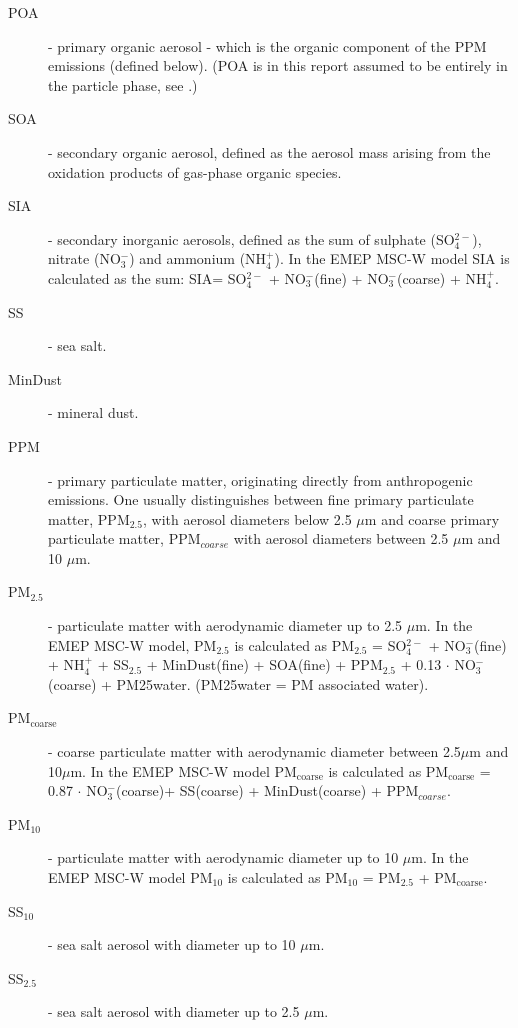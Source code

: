 \begin{description}

\item[POA] - primary organic aerosol - which is the organic component of
the PPM emissions (defined below). (POA is in this report assumed to
be entirely in the particle phase, see \citet{R2020:SVOC}.)
  
\item[SOA] - secondary organic aerosol, defined as the aerosol mass
  arising from the oxidation products of gas-phase organic species.

\item[SIA]- secondary inorganic aerosols, defined as the sum of
  sulphate (SO$^{2-}_4$), nitrate (NO$^-_3$) and ammonium (NH$^+_4$).
  In the EMEP MSC-W model SIA is calculated as the sum: SIA= SO$^{2-}_4$
  + NO$^-_3$(fine) + NO$^-_3$(coarse) + NH$^+_4$.

\item[SS] - sea salt.

\item[MinDust] - mineral dust.

\item[PPM] - primary particulate matter, originating directly from
  anthropogenic emissions. One usually distinguishes between fine
  primary particulate matter, PPM$_{2.5}$, with aerosol diameters
  below 2.5 $\mu$m and coarse primary particulate matter, PPM$_{coarse}$
  with aerosol diameters between 2.5 $\mu$m and 10 $\mu$m.

\item[PM$_{2.5}$] - particulate matter with aerodynamic diameter
  up to 2.5 $\mu$m. In the EMEP
  MSC-W model, PM$_{2.5}$ is calculated as PM$_{2.5}$ = SO$^{2-}_4$
  + NO$^-_3$(fine) + NH$^+_4$ + SS$_{2.5}$ + MinDust(fine)
  + SOA(fine) + PPM$_{2.5}$ + 0.13 $\cdot$ NO$^-_3$(coarse) + PM25water.
  (PM25water = PM associated water).

\item[PM$_{\text{coarse}}$] - coarse particulate matter with aerodynamic
  diameter between 2.5$\mu$m 
  and 10$\mu$m. In the EMEP MSC-W model PM$_{\text{coarse}}$ is calculated
  as PM$_{\text{coarse}}$ = 0.87 $\cdot$ NO$^-_3$(coarse)+ SS(coarse)
  + MinDust(coarse) + PPM$_{coarse}$.

\item[PM$_{10}$] - particulate matter with aerodynamic diameter
  up to 10 $\mu$m. In the EMEP
   MSC-W model PM$_{10}$ is calculated as PM$_{10}$ = PM$_{2.5}$
  + PM$_{\text{coarse}}$.

\item[SS$_{10}$]  - sea salt aerosol with diameter
  up to 10 $\mu$m.
  
\item[SS$_{2.5}$]  - sea salt aerosol with diameter
  up to 2.5 $\mu$m.

\end{description}

